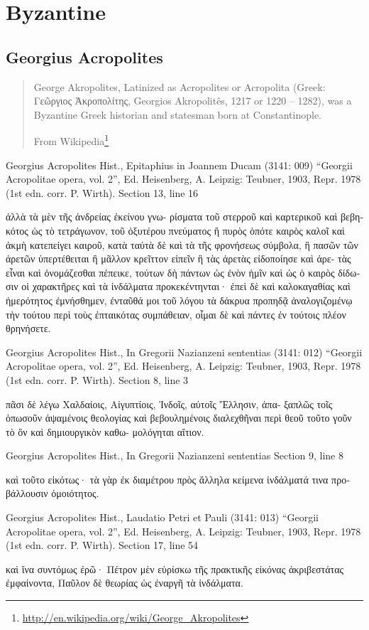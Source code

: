 \documentclass[12pt,letterpaper,twoside,final]{memoir}
\begin{document}
\chapter{Byzantine}%
\minitoc


\section{Georgius Acropolites}
\blockquote[From Wikipedia\footnote{\url{http://en.wikipedia.org/wiki/George_Akropolites}}]{George Akropolites, Latinized as Acropolites or Acropolita (Greek: Γεῶργιος Ἀκροπολίτης, Georgios Akropolitês, 1217 or 1220 – 1282), was a Byzantine Greek historian and statesman born at Constantinople.}
\begin{greek}

Georgius Acropolites Hist., Epitaphius in Joannem Ducam (3141: 009)
“Georgii Acropolitae opera, vol. 2”, Ed. Heisenberg, A.
Leipzig: Teubner, 1903, Repr. 1978 (1st edn. corr. P. Wirth).
Section 13, line 16

                   ἀλλὰ τὰ μὲν τῆς ἀνδρείας ἐκείνου γνω-
ρίσματα τοῦ στερροῦ καὶ καρτερικοῦ καὶ βεβηκότος ὡς τὸ 
τετράγωνον, τοῦ ὀξυτέρου πνεύματος ἢ πυρὸς ὁπότε καιρὸς 
καλοῖ καὶ ἀκμὴ κατεπείγει καιροῦ, κατὰ ταὐτὰ δὲ καὶ τὰ 
τῆς φρονήσεως σύμβολα, ἣ πασῶν τῶν ἀρετῶν ὑπερτέθειται 
ἢ μᾶλλον κρεῖττον εἰπεῖν ἣ τὰς ἀρετὰς εἰδοποίησε καὶ ἀρε-
τὰς εἶναι καὶ ὀνομάζεσθαι πέπεικε, τούτων δὴ πάντων ὡς 
ἐνὸν ἡμῖν καὶ ὡς ὁ καιρὸς δίδωσιν οἱ χαρακτῆρες καὶ τὰ 
ἰνδάλματα προκεκέντηνται· ἐπεὶ δὲ καὶ καλοκαγαθίας καὶ 
ἡμερότητος ἐμνήσθημεν, ἐνταῦθά μοι τοῦ λόγου τὰ 
δάκρυα προπηδᾷ ἀναλογιζομένῳ τὴν τούτου περὶ τοὺς 
ἐπταικότας συμπάθειαν, οἶμαι δὲ καὶ πάντες ἐν τούτοις 
πλέον θρηνήσετε. 



Georgius Acropolites Hist., In Gregorii Nazianzeni sententias (3141: 012)
“Georgii Acropolitae opera, vol. 2”, Ed. Heisenberg, A.
Leipzig: Teubner, 1903, Repr. 1978 (1st edn. corr. P. Wirth).
Section 8, line 3

                                                             πᾶσι 
δὲ λέγω Χαλδαίοις, Αἰγυπτίοις, Ἰνδοῖς, αὐτοῖς Ἕλλησιν, ἁπα-
ξαπλῶς τοῖς ὁπωσοῦν ἁψαμένοις θεολογίας καὶ βεβουλημένοις 
διαλεχθῆναι περὶ θεοῦ τοῦτο γοῦν τὸ ὂν καὶ δημιουργικὸν καθω-
μολόγηται αἴτιον. 



Georgius Acropolites Hist., In Gregorii Nazianzeni sententias 
Section 9, line 8

                                             καὶ τοῦτο εἰκότως· 
τὰ γὰρ ἐκ διαμέτρου πρὸς ἄλληλα κείμενα ἰνδάλματά τινα 
προβάλλουσιν ὁμοιότητος. 



Georgius Acropolites Hist., Laudatio Petri et Pauli (3141: 013)
“Georgii Acropolitae opera, vol. 2”, Ed. Heisenberg, A.
Leipzig: Teubner, 1903, Repr. 1978 (1st edn. corr. P. Wirth).
Section 17, line 54

                                                     καὶ ἵνα συντόμως 
ἐρῶ· Πέτρον μὲν εὑρίσκω τῆς πρακτικῆς εἰκόνας ἀκριβεστάτας 
ἐμφαίνοντα, Παῦλον δὲ θεωρίας ὡς ἐναργῆ τὰ ἰνδάλματα. 

\end{greek}
\end{document}
